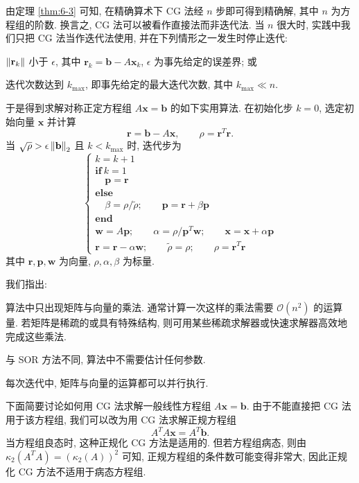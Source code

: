 由定理 \ref{thm:6-3} 可知, 在精确算术下 CG 法经 $n$ 步即可得到精确解, 其中 $n$ 为方程组的阶数. 换言之, CG 法可以被看作直接法而非迭代法. 当 $n$ 很大时, 实践中我们只把 CG 法当作迭代法使用, 并在下列情形之一发生时停止迭代:
\begin{romanlist}
  \item $\left\|\mathbf{r}_k\right\|$ 小于 $\epsilon$, 其中 $\mathbf{r}_k=\mathbf{b}-A\mathbf{x}_k$, $\epsilon$ 为事先给定的误差界; 或
  \item 迭代次数达到 $k_{\max}$, 即事先给定的最大迭代次数, 其中 $k_{\max}\ll n$.
\end{romanlist}
于是得到求解对称正定方程组 $A\mathbf{x}=\mathbf{b}$ 的如下实用算法. 在初始化步 $k=0$, 选定初始向量 $\mathbf{x}$ 并计算
\[
  \mathbf{r}=\mathbf{b}-A\mathbf{x},\qquad \rho=\mathbf{r}^T\mathbf{r}.
\]
当 $\sqrt{\rho}>\epsilon\left\|\mathbf{b}\right\|_2$ 且 $k<k_{\max}$ 时, 迭代步为
\[
  \left\{
  \begin{array}{l}
    k=k+1\\
    \textbf{if}\ k=1\\
    \quad \mathbf{p}=\mathbf{r}\\
    \textbf{else}\\
    \quad \beta=\rho/\tilde{\rho};\qquad \mathbf{p}=\mathbf{r}+\beta\mathbf{p}\\
    \textbf{end}\\
    \mathbf{w}=A\mathbf{p};\qquad
    \alpha=\rho/\mathbf{p}^T\mathbf{w};\qquad
    \mathbf{x}=\mathbf{x}+\alpha\mathbf{p}\\
    \mathbf{r}=\mathbf{r}-\alpha\mathbf{w};\qquad
    \tilde{\rho}=\rho;\qquad
    \rho=\mathbf{r}^T\mathbf{r}
  \end{array}
  \right.
\]
其中 $\mathbf{r},\mathbf{p},\mathbf{w}$ 为向量, $\rho,\alpha,\beta$ 为标量.

我们指出:
\begin{parenlist}
  \item 算法中只出现矩阵与向量的乘法. 通常计算一次这样的乘法需要 $\mathcal{O}(n^2)$ 的运算量. 若矩阵是稀疏的或具有特殊结构, 则可用某些稀疏求解器或快速求解器高效地完成这些乘法.
  \item 与 SOR 方法不同, 算法中不需要估计任何参数.
  \item 每次迭代中, 矩阵与向量的运算都可以并行执行.
\end{parenlist}

下面简要讨论如何用 CG 法求解一般线性方程组 $A\mathbf{x}=\mathbf{b}$. 由于不能直接把 CG 法用于该方程组, 我们可以改为用 CG 法求解正规方程组
\[
  A^TA\mathbf{x}=A^T\mathbf{b}.
\]
当方程组良态时, 这种正规化 CG 方法是适用的. 但若方程组病态, 则由 $\kappa_2(A^TA)=(\kappa_2(A))^2$ 可知, 正规方程组的条件数可能变得非常大, 因此正规化 CG 方法不适用于病态方程组.

